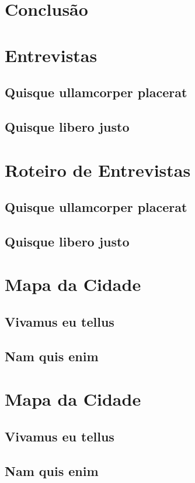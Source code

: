 \documentclass{Arquivos/abntexUFT}
\begin{document}
\chapter{Conclusão}
\lipsum[77]


\printbibliography[heading=referencias_abnt]
\clearpage



\appendix
{}

\chapter{Entrevistas}
\section{Quisque ullamcorper placerat}
\lipsum[4]
\section{Quisque libero justo}
\lipsum[9]

\chapter{Roteiro de Entrevistas}
\section{Quisque ullamcorper placerat}
\lipsum[4]
\section{Quisque libero justo}
\lipsum[9]



\iniciarAnexos
{}

\chapter{Mapa da Cidade}
\lipsum[2]
\section{Vivamus eu tellus}
\lipsum[1]
\section{Nam quis enim}
\lipsum[101]

\chapter{Mapa da Cidade}
\section{Vivamus eu tellus}
\lipsum[1]
\section{Nam quis enim}
\lipsum[101]
\end{document}
